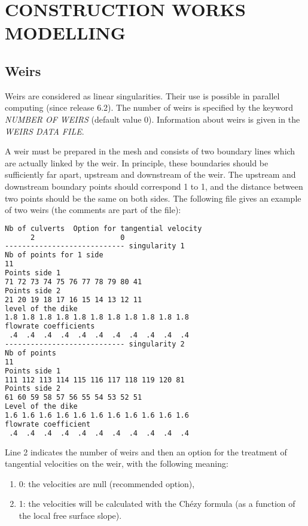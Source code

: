 
\chapter{  CONSTRUCTION WORKS MODELLING}
\label{ch:constr:wm}

\section{ Weirs}
\label{sec:weirs}
 Weirs are considered as linear singularities. Their use is possible in parallel computing (since release 6.2). The number of weirs is specified by the keyword \textit{NUMBER OF WEIRS} (default value 0). Information about weirs is given in the \textit{WEIRS DATA FILE}.

 A weir must be prepared in the mesh and consists of two boundary lines which are actually linked by the weir. In principle, these boundaries should be sufficiently far apart, upstream and downstream of the weir. The upstream and 
downstream boundary points should correspond 1 to 1, and the distance between two points should be the same on both sides. The following file gives an example of two weirs (the comments are part of the file):
\begin{lstlisting}[language=bash]
Nb of culverts  Option for tangential velocity
      2                    0
---------------------------- singularity 1
Nb of points for 1 side
11
Points side 1
71 72 73 74 75 76 77 78 79 80 41
Points side 2
21 20 19 18 17 16 15 14 13 12 11
level of the dike
1.8 1.8 1.8 1.8 1.8 1.8 1.8 1.8 1.8 1.8 1.8
flowrate coefficients
 .4  .4  .4  .4  .4  .4  .4  .4  .4  .4  .4
---------------------------- singularity 2
Nb of points
11
Points side 1
111 112 113 114 115 116 117 118 119 120 81
Points side 2
61 60 59 58 57 56 55 54 53 52 51
Level of the dike
1.6 1.6 1.6 1.6 1.6 1.6 1.6 1.6 1.6 1.6 1.6
flowrate coefficient
 .4  .4  .4  .4  .4  .4  .4  .4  .4  .4  .4
\end{lstlisting}

 Line 2 indicates the number of weirs and then an option for the treatment of tangential velocities on the weir, with the following meaning:

\begin{enumerate}
\item [\nonumber] 0: the velocities are null (recommended option),

\item [\nonumber] 1: the velocities will be calculated with the Ch\'{e}zy formula (as a function of the local free surface slope).
\end{enumerate}

